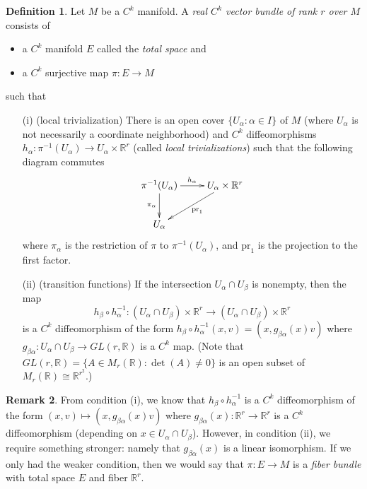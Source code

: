 \documentclass{amsart}
\numberwithin{equation}{section}
\newcommand{\bR}{\mathbb{R}}
\theoremstyle{definition}
\newtheorem{definition}{Definition} [section]
\newtheorem{remark}[definition]{Remark}
\theoremstyle{theorem}
\begin{document}
\begin{definition} \label{vector-bundle}
Let $M$ be a $C^k$ manifold. A {\em real $C^k$ vector bundle of rank $r$ over $M$} consists of
\begin{itemize}
\item a $C^k$ manifold $E$ called the {\em total space} and 
\item a $C^k$ surjective map $\pi : E \to M$
\end{itemize}
such that 
\begin{enumerate}
\item[(i)] (local trivialization) There is an open cover $\{ U_\alpha:\alpha\in I\}$ of $M$ 
(where $U_\alpha$ is not necessarily a coordinate neighborhood) and $C^k$ diffeomorphisms 
$h_\alpha : \pi^{-1}(U_\alpha) \to U_\alpha \times \mathbb{R}^r$ (called {\em local trivializations}) 
such that the following diagram commutes 
\[
\xymatrix{
\pi^{-1}(U_\alpha) \ar[r]^{h_\alpha} \ar[d]_{\pi_\alpha} & \ar[dl]^{\mathrm{pr}_1} U_\alpha \times \mathbb{R}^r \\
U_\alpha
}
\]
where $\pi_\alpha$ is the restriction of $\pi$ to $\pi^{-1}(U_\alpha)$, and $\mathrm{pr}_1$ is the projection
to the first factor. 
\item[(ii)] (transition functions) If the intersection $U_\alpha \cap U_\beta$ is nonempty, then the map 
\[
h_\beta \circ h_\alpha^{-1} : (U_\alpha \cap U_\beta) \times \mathbb{R}^r \to (U_\alpha \cap U_\beta) \times \mathbb{R}^r
\]
is a $C^k$ diffeomorphism of the form $h_\beta \circ h_\alpha^{-1}(x,v) = (x, g_{\beta\alpha}(x)v)$ where $g_{\beta\alpha} : U_\alpha \cap U_\beta \to GL(r,\bR)$ is a $C^k$ map. (Note that $GL(r,\bR)=\{ A\in M_r(\bR):\det(A)\neq 0\}$ is an open subset
of $M_r(\bR)\cong \bR^{r^2}$.)
\end{enumerate}
\end{definition}

\begin{remark}
From condition (i), we know that $h_\beta \circ h_\alpha^{-1}$ is a $C^k$ diffeomorphism of the form 
$(x,v) \mapsto (x, g_{\beta\alpha}(x)v)$ where $g_{\beta\alpha}(x) : \bR^r \to \bR^r$ is a $C^k$ diffeomorphism 
(depending on $x\in U_\alpha\cap U_\beta$). 
However, in condition (ii), we require something stronger: namely that $g_{\beta\alpha}(x)$ is a linear isomorphism. 
If we only had the weaker condition, then we would say that $\pi : E \to M$ is a {\em fiber bundle} with 
total space $E$ and fiber $\bR^r$. 
\end{remark}
\end{document}
